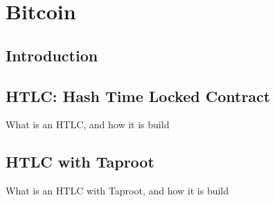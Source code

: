 \chapter{Bitcoin}

\section{Introduction}

\section{HTLC: Hash Time Locked Contract}

What is an HTLC, and how it is build

\section{HTLC with Taproot}
What is an HTLC with Taproot, and how it is build
